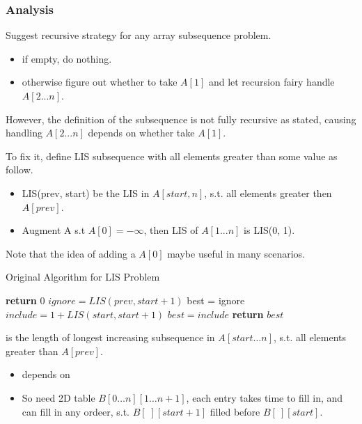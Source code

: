 \subsubsection{Analysis}
Suggest recursive strategy for any array subsequence problem.
\begin{itemize}
    \item if empty, do nothing.
    \item otherwise figure out whether to take $A[1]$ and let recursion fairy handle $A[2...n]$.
\end{itemize}

However, the definition of the subsequence is not fully recursive as stated, causing handling $A[2...n]$ depends on whether take $A[1]$.

To fix it, define LIS subsequence with all elements greater than some value as follow.

\begin{itemize}
    \item LIS(prev, start) be the LIS in $A[start, n]$, s.t. all elements greater then $A[prev]$.
    \item Augment A s.t $A[0] = -\infty$, then LIS of $A[1...n]$ is LIS(0, 1).
\end{itemize}

Note that the idea of adding a $A[0]$ maybe useful in many scenarios.

\begin{algorithm}[H]
\caption{Original Algorithm for LIS Problem}\label{ori_lis_alg}
\begin{algorithmic}[1]
 
    \State \textbf{return} {$0$}
\EndIf
\State $ignore = LIS(prev, start +1)$
\State best = ignore
    \State $include = 1 + LIS(start, start+1)$
        \State $best = include$
    \EndIf
\EndIf
\State \textbf{return} {$best$}
\EndProcedure
\end{algorithmic}
\end{algorithm}

 is the length of longest increasing
subsequence in $A[start\ldots n]$, s.t. all elements greater than 
$A[prev]$.

\analysis

\begin{itemize}
    \item {} depends on 
    \item So need 2D table $B[0\ldots n][1\ldots n+1]$, each entry takes
         time to fill in, and can fill in any ordeer,
        s.t. $B[\;][start+1]$ filled before $B[\ ][start]$.
\end{itemize}
